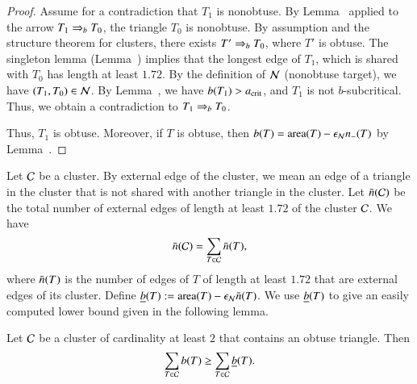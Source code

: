 \begin{proof} 
  Assume for a contradiction that $T_1$ is nonobtuse.  By
  Lemma~ applied to the arrow $T_1\Rightarrow_{b} T_0$, the
  triangle $T_0$ is nonobtuse.  By assumption and the structure
  theorem for clusters, there exists $T'\Rightarrow_{b} T_0$, where $T'$ is
  obtuse.  The singleton lemma (Lemma~) implies
  that the longest edge of $T_1$, which is shared with $T_0$ has
  length at least $1.72$.  By the definition of $\mathcal N$ (nonobtuse
  target), we have $(T_1,T_0)\in\mathcal N$.  By Lemma~, we have
  $b(T_1)>a_\text{crit}$, and $T_1$ is not $b$-subcritical.  Thus, we obtain
  a contradiction to $T_1\Rightarrow_{b} T_0$.

 Thus, $T_1$ is obtuse.
  Moreover, if $T$ is obtuse, then $b(T) = {\operatorname{area}}(T) -\epsilon_{\mathcal N} n_-(T)$ by
  Lemma~.
\end{proof}

Let $\mathcal C$ be a cluster.  By external edge of the cluster, we mean an
edge of a triangle in the cluster that is not shared with another
triangle in the cluster.  Let $\bar n(\mathcal C)$ be the total number of
external edges of length at least $1.72$ of the cluster $\mathcal C$.  We have
\[
\bar n(\mathcal C) =\sum_{T\in \mathcal C} \bar n(T),
\]
where $\bar n(T)$ is the number of edges of $T$ of length at least $1.72$
that are external edges of its cluster.
Define $\underline{b}(T) := {\operatorname{area}}(T)-\epsilon_{\mathcal N}\bar n(T)$.  We use $\underline{b}(T)$ to give an
easily computed lower bound given in the following lemma.

\begin{lemma} 
  Let $\mathcal C$ be a cluster of cardinality at least $2$ 
  that contains an obtuse triangle.
Then 
\[
\sum_{T\in\mathcal C} b(T)\ge \sum_{T\in\mathcal C} \underline{b}(T).
\]
\end{lemma}

